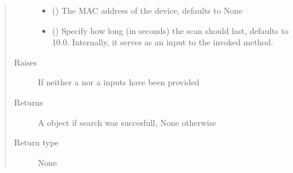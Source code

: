 \documentclass[letterpaper,10pt,english]{sphinxmanual}
\begin{document}
\begin{fulllineitems}
\begin{fulllineitems}
\begin{quote}
\begin{description}
\begin{itemize}
\item {} 
 (\sphinxstyleliteralemphasis{\sphinxupquote{, }}) \textendash{} The MAC address of the device, defaults to None

\item {} 
 (\sphinxstyleliteralemphasis{\sphinxupquote{, }}) \textendash{} Specify how long (in seconds) the scan should last, defaults to 10.0. Internally, it serves as an input to the invoked {\hyperref[\detokenize{simpleble:simpleble.SimpleBleClient.scan}]{}} method.

\end{itemize}

\item[{Raises}] \leavevmode
{} \textendash{} If neither a  nor a  inputs have been provided

\item[{Returns}] \leavevmode
A {\hyperref[\detokenize{simpleble:simpleble.SimpleBleDevice}]{}} object if search was succesfull, None otherwise

\item[{Return type}] \leavevmode
{\hyperref[\detokenize{simpleble:simpleble.SimpleBleDevice}]{}} \textbar{} None

\end{description}\end{quote}

\end{fulllineitems}



\end{fulllineitems}
\end{document}
